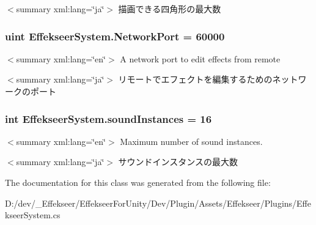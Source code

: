 $<$summary xml\-:lang=\char`\"{}ja\char`\"{}$>$ 描画できる四角形の最大数 \hypertarget{class_effekseer_system_a82dca137e7e455eb03fc07e19ec3c7c9}{
\subsubsection[{Network\-Port}]{\setlength{\rightskip}{0pt plus 5cm}uint Effekseer\-System.\-Network\-Port = 60000}}\label{class_effekseer_system_a82dca137e7e455eb03fc07e19ec3c7c9}
$<$summary xml\-:lang=\char`\"{}en\char`\"{}$>$ A network port to edit effects from remote 

$<$summary xml\-:lang=\char`\"{}ja\char`\"{}$>$ リモートでエフェクトを編集するためのネットワークのポート \hypertarget{class_effekseer_system_ac83155c54d94fc6b61f6f53032923667}{
\subsubsection[{sound\-Instances}]{\setlength{\rightskip}{0pt plus 5cm}int Effekseer\-System.\-sound\-Instances = 16}}\label{class_effekseer_system_ac83155c54d94fc6b61f6f53032923667}
$<$summary xml\-:lang=\char`\"{}en\char`\"{}$>$ Maximum number of sound instances. 

$<$summary xml\-:lang=\char`\"{}ja\char`\"{}$>$ サウンドインスタンスの最大数 

The documentation for this class was generated from the following file\-:\begin{DoxyCompactItemize}
\item 
D\-:/dev/\-\_\-\-Effekseer/\-Effekseer\-For\-Unity/\-Dev/\-Plugin/\-Assets/\-Effekseer/\-Plugins/Effekseer\-System.\-cs\end{DoxyCompactItemize}
